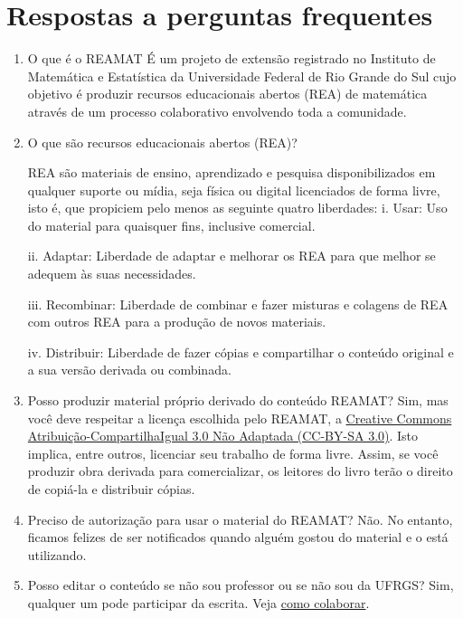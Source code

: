 \documentclass[12pt]{report}
\begin{document}
\chapter*{Respostas a perguntas frequentes}
\begin{enumerate}
\item  O que é o REAMAT
É um projeto de extensão registrado no Instituto de Matemática e Estatística da Universidade Federal de Rio Grande do Sul cujo objetivo é produzir recursos educacionais abertos (REA) de matemática através de um processo colaborativo envolvendo toda a comunidade.

\item O que são recursos educacionais abertos (REA)?

REA são materiais de ensino, aprendizado e pesquisa disponibilizados em qualquer suporte ou mídia, seja física ou digital licenciados de forma livre, isto é, que propiciem pelo menos as seguinte quatro liberdades:
\subitem i. Usar: Uso do material para quaisquer fins, inclusive comercial.

\subitem ii. Adaptar: Liberdade de adaptar e melhorar os REA para que melhor se adequem às suas necessidades.

\subitem iii. Recombinar: Liberdade de combinar e fazer misturas e colagens de REA com outros REA para a produção de novos materiais.

\subitem iv. Distribuir: Liberdade de fazer cópias e compartilhar o conteúdo original e a sua versão derivada ou combinada.

\item Posso produzir material próprio derivado do conteúdo REAMAT?
Sim, mas você deve respeitar a licença escolhida pelo REAMAT, a \href{https://creativecommons.org/licenses/by-sa/3.0/}{Creative Commons Atribuição-CompartilhaIgual 3.0 Não Adaptada (CC-BY-SA 3.0)}. Isto implica, entre outros, licenciar seu trabalho de forma livre. Assim, se você produzir obra derivada para comercializar, os leitores do livro terão o direito de copiá-la e distribuir cópias.

\item Preciso de autorização para usar o material do REAMAT?
Não. No entanto, ficamos felizes de ser notificados quando alguém gostou do material e o está utilizando.

\item Posso editar o conteúdo se não sou professor ou se não sou da UFRGS?
Sim, qualquer um pode participar da escrita. Veja \href{https://www.ufrgs.br/reamat/participe.html}{como colaborar}.


\end{enumerate}
\end{document}
